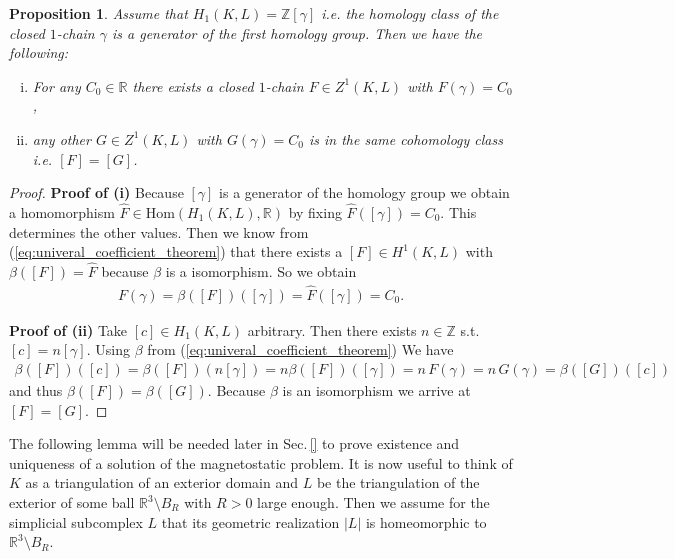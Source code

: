 \documentclass[12pt,a4paper]{article}
\numberwithin{equation}{subsection}
\numberwithin{lemma}{subsection}
\newtheorem{proposition}[lemma]{Proposition}
\theoremstyle{definition}
\newcommand{\integers}{\mathbb{Z}}
\newcommand{\real}{\mathbb{R}}
\begin{document}
\begin{proposition}\label{prop:uniqueness_cochain}
    Assume that $H_1(K,L) = \integers [\gamma]$ i.e. the homology class of the 
    closed $1$-chain $\gamma$ is a generator of the first homology group.
    Then we have the following:
    \begin{enumerate}[(i)]
        \item For any $C_0 \in \real$ there exists a closed $1$-chain 
            $F \in Z^1(K,L)$ with $F(\gamma) = C_0$,
        \item any other $G \in Z^1(K,L)$ with $G(\gamma) = C_0$ 
            is in the same cohomology class i.e. $[F] = [G]$.
    \end{enumerate}
\end{proposition}
\begin{proof}
    \textbf{Proof of (i)} %
    Because $[\gamma]$ is a generator of the homology group we  obtain a 
    homomorphism $\hat{F} \in \text{Hom}(H_1(K,L),\real)$ by fixing
    $\hat{F}([\gamma]) = C_0$. This determines the other values.
    Then we know from (\ref{eq:univeral_coefficient_theorem}) that there exists
    a $[F] \in H^1(K,L)$ with $\beta([F]) = \hat{F}$ because $\beta$ is a 
    isomorphism. So we obtain
    \begin{align*}
        F(\gamma) = \beta([F])([\gamma]) = \hat{F}([\gamma]) = C_0.
    \end{align*}

    \textbf{Proof of (ii)} %
    Take $[c] \in H_1(K,L)$ arbitrary. Then there exists  $n \in \integers$ s.t.
    $[c] = n [\gamma]$.
    Using $\beta$ from (\ref{eq:univeral_coefficient_theorem})
    We have
    \begin{align*}
        \beta([F])([c]) = \beta([F])(n [\gamma]) 
        = n \beta([F])([\gamma]) = n \, F(\gamma) = n \, G(\gamma) = 
        \beta([G])([c])
    \end{align*}
    and thus $\beta([F]) = \beta([G])$. Because $\beta$ is an isomorphism
    we arrive at $[F] = [G]$.
\end{proof}

The following lemma will be needed later in Sec.\,\ref{} to prove existence 
and uniqueness of a solution of the magnetostatic problem. It is now 
useful to think of $K$ as a triangulation of an exterior domain and $L$ 
be the triangulation of the exterior of some ball $\real^3\setminus B_R$ with 
$R > 0$ large enough. Then we assume for the simplicial subcomplex $L$
that its geometric realization $|L|$ is homeomorphic to $\real^3\setminus B_R$.
\end{document}
